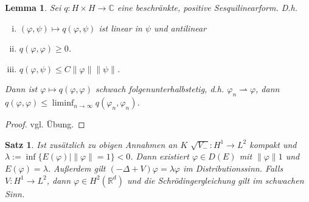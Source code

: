 \documentclass[
paper=a4,
bibtotocnumbered,
liststotocnumbered,
tablecaptionabove,
pointlessnumbers,
twoside,
openright,
10pt
]
{report}
\let\phi\varphi
\newtheorem{satz}[thm]{Satz}
\newtheorem{lem}[thm]{Lemma}
\theoremstyle{definition}
\numberwithin{equation}{chapter}
\begin{document}
\begin{lem}\label{5.1}
Sei $q: H\times H\to \mathbb C$ eine beschränkte, positive Sesquilinearform. D.h.
\begin{enumerate}[(i)]
\item $(\phi, \psi) \mapsto q(\phi, \psi)$ ist linear in $\psi$ und antilinear 
\item $q(\phi, \phi) \ge 0$.
\item $q(\phi, \psi) \le C\| \phi\| \| \psi\|$.
\end{enumerate}
Dann ist $\phi \mapsto q(\phi, \phi)$ schwach folgenunterhalbstetig, d.h. $\phi_n \rightharpoonup \phi$, dann $q(\phi, \phi) \le \liminf_{n\to \infty} q(\phi_n, \phi_n)$.
\end{lem}
\begin{proof}
vgl. Übung.
\end{proof}
\begin{satz}\label{9.2}
Ist zusätzlich zu obigen Annahmen an $K$ $\sqrt{V_-} : H^1 \to L^2$ kompakt und $\lambda:= \inf\{E(\phi) | \|\phi\| =1\} <0$. Dann existiert $\phi \in D(E)$ mit $\| \phi \| 1$ und $E(\phi)=\lambda$. Außerdem gilt $(-\Delta + V) \phi = \lambda \phi$ im Distributionssinn. Falls $V: H^1 \to L^2$, dann $\phi \in H^2(\mathbb R^d)$ und die Schrödingergleichung gilt im schwachen Sinn.
\end{satz}
\end{document}
